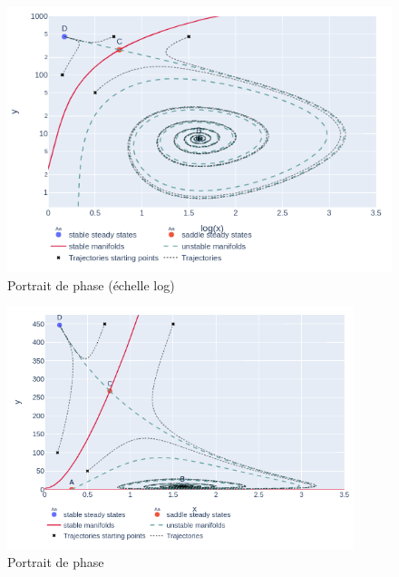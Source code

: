 \documentclass[12pt]{article}
\begin{document}
\begin{figure}[!hb]
         \centering
         \includegraphics[width=\textwidth]{../figures/fig_phase_portrait_log.png}
         \caption{Portrait de phase (échelle log)}
         \label{fig::phase_portrait_log}
\end{figure}

\begin{figure}[!ht]
    \centering
         \includegraphics[width=0.9\textwidth]{../figures/fig_phase_portrait.png}
         \caption{Portrait de phase}
         \label{fig::phase_portrait}
\end{figure}
\end{document}

